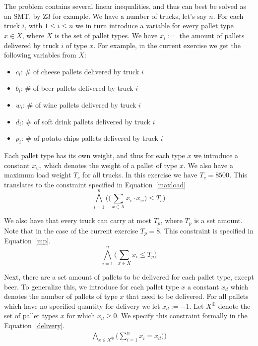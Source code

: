\chapter{}\label{chp:1}
The problem contains several linear inequalities, and thus can best be solved as an SMT, by Z3 for example. We have a number of trucks, let's say $n$. For each truck $i$, with $1 \leq i \leq n$ we in turn introduce a variable for every pallet type $x \in X$, where $X$ is the set of pallet types. We have $x_i :=$ the amount of pallets delivered by truck $i$ of type $x$. For example, in the current exercise we get the following variables from $X$:
\begin{itemize}
    \item $c_i$: \# of cheese pallets delivered by truck $i$
    \item $b_i$: \# of beer pallets delivered by truck $i$
    \item $w_i$: \# of wine pallets delivered by truck $i$
    \item $d_i$: \# of soft drink pallets delivered by truck $i$
    \item $p_i$: \# of potato chips pallets delivered by truck $i$
\end{itemize}

Each pallet type has its own weight, and thus for each type $x$ we introduce a constant $x_w$, which denotes the weight of a pallet of type $x$. We also have a maximum load weight $T_c$ for all trucks. In this exercise we have $T_c = 8500$. This translates to the constraint specified in Equation~\ref{maxload}
\begin{equation}
    \label{maxload}
    \bigwedge^{n}_{i=1}\bigg(\big(\sum_{x \in X} x_i \cdot x_w\big) \leq T_c \bigg)
\end{equation}

We also have that every truck can carry at most $T_p$, where $T_p$ is a set amount. Note that in the case of the current exercise $T_p = 8$. This constraint is specified in Equation~\ref{mp}.
\begin{equation}
    \label{mp}
    \bigwedge^{n}_{i=1}\bigg(\sum_{x \in X} x_i \leq T_p\bigg)
\end{equation}

Next, there are a set amount of pallets to be delivered for each pallet type, except beer. To generalize this, we introduce for each pallet type $x$ a constant $x_d$ which denotes the number of pallets of type $x$ that need to be delivered. For all pallets which have no specified quantity for delivery we let $x_d := -1$. Let $X^{\oplus}$ denote the set of pallet types $x$ for which $x_d \geq 0$. We specify this constraint formally in the Equation~\ref{delivery}.
\begin{equation}
    \begin{aligned}
    \label{delivery}
    \bigwedge_{x \in X^{\oplus}}\bigg(\sum^{n}_{i=1} x_i = x_d)\bigg)
    \end{aligned}
\end{equation}

